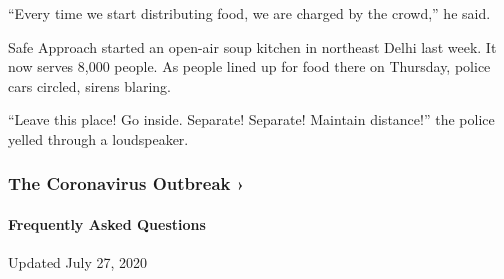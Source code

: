 ``Every time we start distributing food, we are charged by the crowd,''
he said.

Safe Approach started an open-air soup kitchen in northeast Delhi last
week. It now serves 8,000 people. As people lined up for food there on
Thursday, police cars circled, sirens blaring.

``Leave this place! Go inside. Separate! Separate! Maintain distance!''
the police yelled through a loudspeaker.

\href{https://www.nytimes.com/news-event/coronavirus?action=click\&pgtype=Article\&state=default\&region=MAIN_CONTENT_3\&context=storylines_faq}{}

\hypertarget{the-coronavirus-outbreak-}{%
\subsubsection{The Coronavirus Outbreak
›}\label{the-coronavirus-outbreak-}}

\hypertarget{frequently-asked-questions}{%
\paragraph{Frequently Asked
Questions}\label{frequently-asked-questions}}

Updated July 27, 2020

